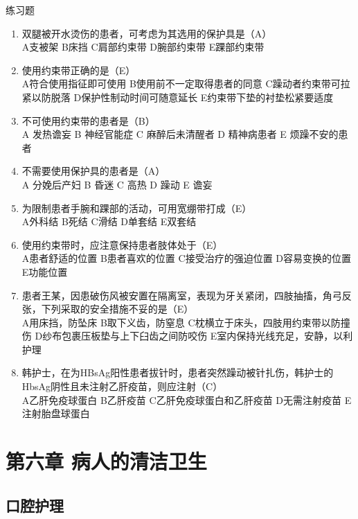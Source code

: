 \documentclass[11pt, a4paper]{ctexart}
\begin{document}
\begin{examplebox}{练习题}
\begin{enumerate}
    \item 双腿被开水烫伤的患者，可考虑为其选用的保护具是（A）\\
    A支被架 \quad B床挡 \quad C肩部约束带 \quad D腕部约束带 \quad E踝部约束带
    \item 使用约束带正确的是（E）\\
    A符合使用指征即可使用 \quad B使用前不一定取得患者的同意 \quad C躁动者约束带可拉紧以防脱落 \quad D保护性制动时间可随意延长 \quad E约束带下垫的衬垫松紧要适度
    \item 不可使用约束带的患者是（B）\\
    A 发热谵妄 \quad B 神经官能症 \quad C 麻醉后未清醒者 \quad D 精神病患者 \quad E 烦躁不安的患者
    \item 不需要使用保护具的患者是（A）\\
    A 分娩后产妇 \quad B 昏迷 \quad C 高热 \quad D 躁动 \quad E 谵妄
    \item 为限制患者手腕和踝部的活动，可用宽绷带打成（E）\\
    A外科结 \quad B死结 \quad C滑结 \quad D单套结 \quad E双套结
    \item 使用约束带时，应注意保持患者肢体处于（E）\\
    A患者舒适的位置 \quad B患者喜欢的位置 \quad C接受治疗的强迫位置 \quad D容易变换的位置 \quad E功能位置
    \item 患者王某，因患破伤风被安置在隔离室，表现为牙关紧闭，四肢抽搐，角弓反张，下列采取的安全措施不妥的是（E）\\
    A用床挡，防坠床 \quad B取下义齿，防窒息 \quad C枕横立于床头，四肢用约束带以防撞伤 \quad D纱布包裹压板垫与上下臼齿之间防咬伤 \quad E室内保持光线充足，安静，以利护理
    \item 韩护士，在为HBsAg阳性患者拔针时，患者突然躁动被针扎伤，韩护士的HbsAg阴性且未注射乙肝疫苗，则应注射（C）\\
    A乙肝免疫球蛋白 \quad B乙肝疫苗 \quad C乙肝免疫球蛋白和乙肝疫苗 \quad D无需注射疫苗 \quad E注射胎盘球蛋白
\end{enumerate}
\end{examplebox}

\section{第六章 病人的清洁卫生}
\subsection{口腔护理}
\end{document}
